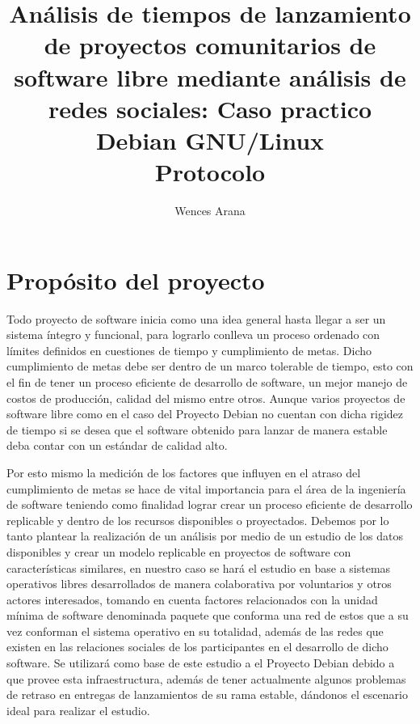 \documentclass[12pt]{report}
\begin{document}
  \title{ {Análisis  de  tiempos  de  lanzamiento  de
proyectos comunitarios  de software  libre mediante análisis  de redes
sociales:   Caso   practico    Debian   GNU/Linux}
\\   {Protocolo}   }
\author{Wences Arana}
\maketitle

\tableofcontents
\chapter*{Propósito del proyecto}

Todo proyecto de software inicia como  una idea general hasta llegar a
ser un sistema íntegro y  funcional, para lograrlo conlleva un proceso
ordenado con límites definidos en  cuestiones de tiempo y cumplimiento
de metas.   Dicho cumplimiento de  metas debe  ser dentro de  un marco
tolerable de tiempo, esto con el  fin de tener un proceso eficiente de
desarrollo  de software,  un  mejor manejo  de  costos de  producción,
calidad del  mismo entre  otros. Aunque  varios proyectos  de software
libre como en el caso del Proyecto Debian no cuentan con dicha rigidez
de tiempo si  se desea que el software obtenido  para lanzar de manera
estable deba contar con un estándar de calidad alto.

Por esto mismo  la medición de los factores que  influyen en el atraso
del cumplimiento de metas se hace de vital importancia para el área de
la  ingeniería de  software teniendo  como finalidad  lograr crear  un
proceso eficiente  de desarrollo replicable  y dentro de  los recursos
disponibles  o   proyectados.  Debemos   por  lo  tanto   plantear  la
realización  de un  análisis  por medio  de un  estudio  de los  datos
disponibles y crear un modelo  replicable en proyectos de software con
características similares, en nuestro caso  se hará el estudio en base
a sistemas operativos libres  desarrollados de manera colaborativa por
voluntarios y  otros actores  interesados, tomando en  cuenta factores
relacionados con la  unidad mínima de software  denominada paquete que
conforma una red de estos que  a su vez conforman el sistema operativo
en su  totalidad, además de  las redes  que existen en  las relaciones
sociales de los  participantes en el desarrollo de  dicho software. Se
utilizará como base de este estudio  a el Proyecto Debian debido a que
provee  esta  infraestructura,  además de  tener  actualmente  algunos
problemas de retraso  en entregas de lanzamientos de  su rama estable,
dándonos el escenario ideal para realizar el estudio.
\end{document}
